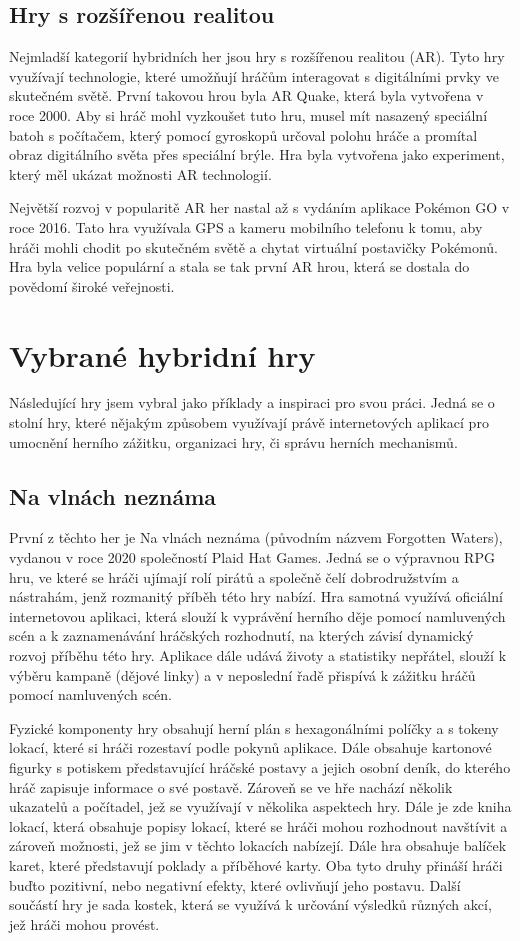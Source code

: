 \subsection{Hry s rozšířenou realitou}
Nejmladší kategorií hybridních her jsou hry s rozšířenou realitou (AR). Tyto hry využívají technologie, které umožňují hráčům interagovat s digitálními prvky ve skutečném světě. První takovou hrou byla AR Quake, která byla vytvořena v roce 2000. Aby si hráč mohl vyzkoušet tuto hru, musel mít nasazený speciální batoh s počítačem, který pomocí gyroskopů určoval polohu hráče a promítal obraz digitálního světa přes speciální brýle. Hra byla vytvořena jako experiment, který měl ukázat možnosti AR technologií.\cite{ar_history}

Největší rozvoj v popularitě AR her nastal až s vydáním aplikace Pokémon GO v roce 2016. Tato hra využívala GPS a kameru mobilního telefonu k tomu, aby hráči mohli chodit po skutečném světě a chytat virtuální postavičky Pokémonů. Hra byla velice populární a stala se tak první AR hrou, která se dostala do povědomí široké veřejnosti.

\section{Vybrané hybridní hry}
Následující hry jsem vybral jako příklady a inspiraci pro svou práci. Jedná se o stolní hry, které nějakým způsobem využívají právě internetových aplikací pro umocnění herního zážitku, organizaci hry, či správu herních mechanismů.

\subsection{Na vlnách neznáma}
První z těchto her je Na vlnách neznáma (původním názvem Forgotten Waters), vydanou v roce 2020 společností Plaid Hat Games. Jedná se o výpravnou RPG hru, ve které se hráči ujímají rolí pirátů a společně čelí dobrodružstvím a nástrahám, jenž rozmanitý příběh této hry nabízí. Hra samotná využívá oficiální internetovou aplikaci\cite{forgotten_waters_app}, která slouží k vyprávění herního děje pomocí namluvených scén a k zaznamenávání hráčských rozhodnutí, na kterých závisí dynamický rozvoj příběhu této hry. Aplikace dále udává životy a statistiky nepřátel, slouží k výběru kampaně (dějové linky) a v neposlední řadě přispívá k zážitku hráčů pomocí namluvených scén.

Fyzické komponenty hry obsahují herní plán s hexagonálními políčky a s tokeny lokací, které si hráči rozestaví podle pokynů aplikace. Dále obsahuje kartonové figurky s potiskem představující hráčské postavy a jejich osobní deník, do kterého hráč zapisuje informace o své postavě. Zároveň se ve hře nachází několik ukazatelů a počítadel, jež se využívají v několika aspektech hry. Dále je zde kniha lokací, která obsahuje popisy lokací, které se hráči mohou rozhodnout navštívit a zároveň možnosti, jež se jim v těchto lokacích nabízejí. Dále hra obsahuje balíček karet, které představují poklady a příběhové karty. Oba tyto druhy přináší hráči buďto pozitivní, nebo negativní efekty, které ovlivňují jeho postavu. Další součástí hry je sada kostek, která se využívá k určování výsledků různých akcí, jež hráči mohou provést.

